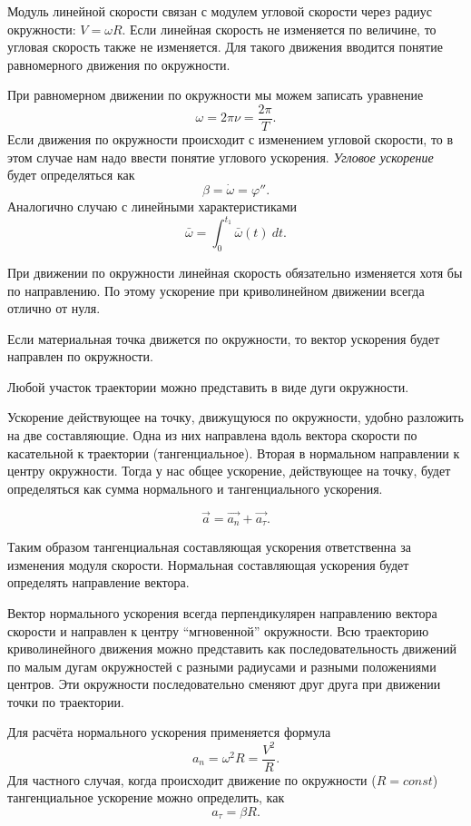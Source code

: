 \documentclass[10pt]{extbook}
\begin{document}
Модуль линейной скорости связан с модулем угловой скорости через радиус
окружности: \( V = \omega R \). Если линейная скорость не изменяется по величине, то
угловая скорость также не изменяется. Для такого движения вводится понятие
равномерного движения по окружности.

При равномерном движении по окружности мы можем записать уравнение \[
	\omega = 2 \pi \nu = \frac{2 \pi}{T}
	.\] Если движения по окружности происходит с изменением угловой скорости, то
в этом случае нам надо ввести понятие углового ускорения. \emph{Угловое
	ускорение} будет определяться как \[
	\beta = \dot{\omega} = \varphi''
	.\] Аналогично случаю с линейными характеристиками \[
	\bar{\omega} = \int_{{0}}^{{t_1}} {\bar{\omega} (t)} \: d{t} {}
	.\]

При движении по окружности линейная скорость обязательно изменяется хотя бы по
направлению. По этому ускорение при криволинейном движении всегда отлично от
нуля.

Если материальная точка движется по окружности, то вектор ускорения будет
направлен по окружности.

Любой участок траектории можно представить в виде дуги окружности.

Ускорение действующее на точку, движущуюся по окружности, удобно разложить на
две составляющие. Одна из них направлена вдоль вектора скорости по касательной
к траектории (тангенциальное). Вторая в нормальном направлении к центру
окружности. Тогда у нас общее ускорение, действующее на точку, будет
определяться как сумма нормального и тангенциального ускорения.

\[
	\vec{a} = \vec{a_n} + \vec{a_\tau}
	.\]

Таким образом тангенциальная составляющая ускорения ответственна за изменения
модуля скорости. Нормальная составляющая ускорения будет определять направление
вектора.

Вектор нормального ускорения всегда перпендикулярен направлению вектора
скорости и направлен к центру ``мгновенной'' окружности. Всю траекторию
криволинейного движения можно представить как последовательность движений по
малым дугам окружностей с разными радиусами и разными положениями центров. Эти
окружности последовательно сменяют друг друга при движении точки по траектории.

Для расчёта нормального ускорения применяется формула \[
	a_n = \omega^2 R = \frac{V^2 }{R}
	.\] Для частного случая, когда происходит движение по окружности (\( R = const \)) тангенциальное ускорение можно определить, как \[
	a_\tau = \beta R
	.\]
\end{document}
